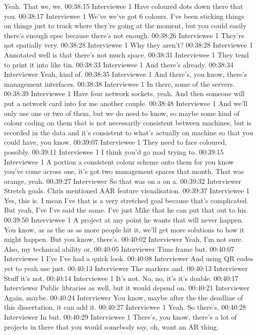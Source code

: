 Yeah. That we, we.
00:38:15 Interviewee 1
Have coloured dots down there that you.
00:38:17 Interviewee 1
We've we've got 6 colours. I've been sticking things on things just to track where they're going at the moment, but you could easily there's enough spec because there's not enough.
00:38:26 Interviewee 1
They're not spatially very.
00:38:28 Interviewee 1
Why they aren't?
00:38:28 Interviewee 1
Annotated well is that there's not much space.
00:38:31 Interviewee 1
They tend to print it into like tin.
00:38:33 Interviewee 1
And there's already.
00:38:34 Interviewer
Yeah, kind of.
00:38:35 Interviewee 1
And there's, you know, there's management interfaces.
00:38:38 Interviewee 1
In there, some of the servers.
00:38:39 Interviewee 1
Have four network sockets, yeah. And then someone will put a network card into for me another couple.
00:38:48 Interviewee 1
And we'll only use one or two of them, but we do need to know, so maybe some kind of colour coding on them that is not necessarily consistent between machines, but is recorded in the data and it's consistent to what's actually on machine so that you could have, you know.
00:39:07 Interviewee 1
They need to face coloured, possibly.
00:39:11 Interviewee 1
I think you'd go mad trying to.
00:39:15 Interviewee 1
A portion a consistent colour scheme onto them for you know you've come across one, it's got two management spaces that month. That was orange, yeah.
00:39:27 Interviewer
So that was on a on a.
00:39:32 Interviewer
Stretch goals. Chris mentioned AAR feature visualisation.
00:39:37 Interviewee 1
Yes, this is. I mean I've that is a very stretched goal because that's complicated. But yeah, I've I've said the same. I've just Mike that he can put that out to his.
00:39:50 Interviewee 1
A project at any point he wants that will never happen. You know, as as the as as more people hit it, we'll get more solutions to how it might happen. But you know, there's.
00:40:02 Interviewer
Yeah, I'm not sure. Also, my technical ability or.
00:40:05 Interviewer
Time frame but.
00:40:07 Interviewee 1
I've I've had a quick look.
00:40:08 Interviewer
And using QR codes yet to yeah use just.
00:40:13 Interviewer
The markers and.
00:40:13 Interviewer
Stuff it's not.
00:40:14 Interviewee 1
It's not. No, no, it's it's doable.
00:40:17 Interviewer
Public libraries as well, but it would depend on.
00:40:21 Interviewer
Again, maybe.
00:40:24 Interviewer
You know, maybe after the the deadline of this dissertation, it can add it.
00:40:27 Interviewee 1
Yeah. So there's.
00:40:28 Interviewer
In but.
00:40:29 Interviewee 1
There's, you know, there's a lot of projects in there that you would somebody say, oh, want an AR thing.
